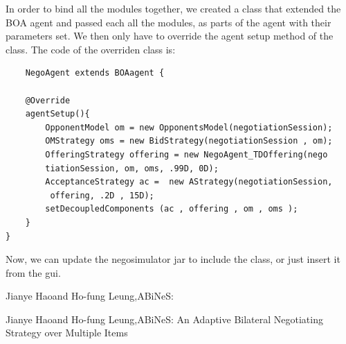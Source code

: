 \documentclass[html]{report}    %
\begin{document}
In order to bind all the modules together, we created a class that extended the BOA agent and passed each all the modules, as parts of the agent with their parameters set. We then only have to override the agent setup method of the class.  The code of the overriden class is:


\begin{verbatim}
	NegoAgent extends BOAagent {
    
    @Override
    agentSetup(){
        OpponentModel om = new OpponentsModel(negotiationSession);
        OMStrategy oms = new BidStrategy(negotiationSession , om);
        OfferingStrategy offering = new NegoAgent_TDOffering(nego
        tiationSession, om, oms, .99D, 0D);
        AcceptanceStrategy ac =  new AStrategy(negotiationSession,
         offering, .2D , 15D);
        setDecoupledComponents (ac , offering , om , oms );
    }
}
\end{verbatim}
Now, we can update the negosimulator jar to include the class, or just insert it from the gui.







\begin{thebibliography}{5}

 Jianye Haoand Ho-fung Leung,ABiNeS:

 Jianye Haoand Ho-fung Leung,ABiNeS: An Adaptive Bilateral Negotiating Strategy over Multiple Items
\end{thebibliography}
\end{document}
